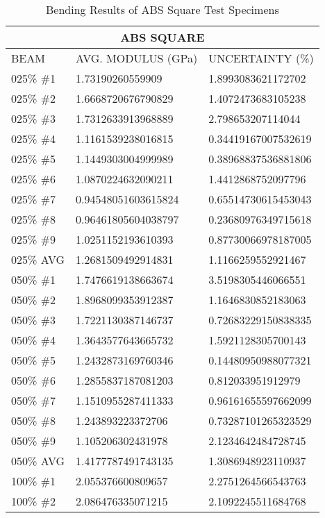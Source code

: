 \begin{longtable}{ | X | X | X | }
	\caption{Bending Results of ABS Square Test Specimens}
	\label{tab:abs_square_data}
	\endhead
	\hline
	\multicolumn{3}{|c|}{ABS SQUARE} \\ \hline
	BEAM & AVG. MODULUS (GPa) & UNCERTAINTY (\%) \\ \hline
	025\% \#1 & 1.73190260559909 & 1.8993083621172702 \\ \hline
	025\% \#2 & 1.6668720676790829 & 1.4072473683105238 \\ \hline
	025\% \#3 & 1.7312633913968889 & 2.798653207114044 \\ \hline
	025\% \#4 & 1.1161539238016815 & 0.34419167007532619 \\ \hline
	025\% \#5 & 1.1449303004999989 & 0.38968837536881806 \\ \hline
	025\% \#6 & 1.0870224632090211 & 1.4412868752097796 \\ \hline
	025\% \#7 & 0.94548051603615824 & 0.65514730615453043 \\ \hline
	025\% \#8 & 0.96461805604038797 & 0.23680976349715618 \\ \hline
	025\% \#9 & 1.0251152193610393 & 0.87730066978187005 \\ \hline
	025\% AVG & 1.2681509492914831 & 1.1166259552921467 \\ \hline
	050\% \#1 & 1.7476619138663674 & 3.5198305446066551 \\ \hline
	050\% \#2 & 1.8968099353912387 & 1.1646830852183063 \\ \hline
	050\% \#3 & 1.7221130387146737 & 0.72683229150838335 \\ \hline
	050\% \#4 & 1.3643577643665732 & 1.5921128305700143 \\ \hline
	050\% \#5 & 1.2432873169760346 & 0.14480950988077321 \\ \hline
	050\% \#6 & 1.2855837187081203 & 0.812033951912979 \\ \hline
	050\% \#7 & 1.1510955287411333 & 0.96161655597662099 \\ \hline
	050\% \#8 & 1.243893223372706 & 0.73287101265323529 \\ \hline
	050\% \#9 & 1.105206302431978 & 2.1234642484728745 \\ \hline
	050\% AVG & 1.4177787491743135 & 1.3086948923110937 \\ \hline
	100\% \#1 & 2.055376600809657 & 2.2751264566543763 \\ \hline
	100\% \#2 & 2.086476335071215 & 2.1092245511684768 \\ \hline

\end{longtable}
